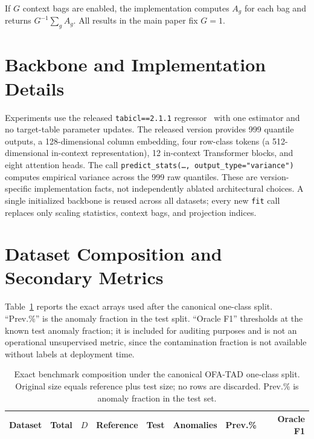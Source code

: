 \documentclass{article}
\begin{document}
If $G$ context bags are enabled, the implementation computes $A_g$ for each bag and returns $G^{-1} \sum_g A_g$. All results in the main paper fix $G = 1$.

\section{Backbone and Implementation Details}
\label{app:backbone}

Experiments use the released \texttt{tabicl==2.1.1} regressor~\citep{qu2026tabiclv2} with one estimator and no target-table parameter updates. The released version provides 999 quantile outputs, a 128-dimensional column embedding, four row-class tokens (a 512-dimensional in-context representation), 12 in-context Transformer blocks, and eight attention heads. The call \texttt{predict\_stats(\ldots, output\_type="variance")} computes empirical variance across the 999 raw quantiles. These are version-specific implementation facts, not independently ablated architectural choices. A single initialized backbone is reused across all datasets; every new \texttt{fit} call replaces only scaling statistics, context bags, and projection indices.

\section{Dataset Composition and Secondary Metrics}
\label{app:data}

Table~\ref{tab:composition} reports the exact arrays used after the canonical one-class split. ``Prev.\%'' is the anomaly fraction in the test split. ``Oracle F1'' thresholds at the known test anomaly fraction; it is included for auditing purposes and is not an operational unsupervised metric, since the contamination fraction is not available without labels at deployment time.

\begin{table}[h]
\centering
\caption{Exact benchmark composition under the canonical OFA-TAD one-class split. Original size equals reference plus test size; no rows are discarded. Prev.\% is anomaly fraction in the test set.}
\label{tab:composition}
\small
\setlength{\tabcolsep}{5pt}
\begin{tabular}{lrrrrrrr}
\toprule
Dataset & Total & $D$ & Reference & Test & Anomalies & Prev.\% & Oracle F1\\
\midrule
%
\end{tabular}
\end{table}
\end{document}
